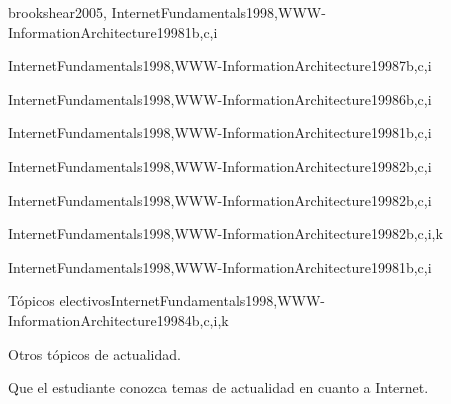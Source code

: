 \begin{syllabus}
\begin{unit}{\SEToolsAndEnvironmentsDef}{brookshear2005, InternetFundamentals1998,WWW-InformationArchitecture1998}{1}{b,c,i}
   \SEToolsAndEnvironmentsAllTopics
   \SEToolsAndEnvironmentsAllObjectives
\end{unit}

\begin{unit}{\NCWebOrganizationDef}{InternetFundamentals1998,WWW-InformationArchitecture1998}{7}{b,c,i}
   \NCWebOrganizationAllTopics
   \NCWebOrganizationAllObjectives
\end{unit}

\begin{unit}{\NCNetworkedApplicationsDef}{InternetFundamentals1998,WWW-InformationArchitecture1998}{6}{b,c,i}
   \NCNetworkedApplicationsAllTopics
   \NCNetworkedApplicationsAllObjectives
\end{unit}

\begin{unit}{\HCGUIDesignDef}{InternetFundamentals1998,WWW-InformationArchitecture1998}{1}{b,c,i}
   \HCGUIDesignAllTopics
   \HCGUIDesignAllObjectives
\end{unit}

\begin{unit}{\NCMultimediaTechnologiesDef}{InternetFundamentals1998,WWW-InformationArchitecture1998}{2}{b,c,i}
   \NCMultimediaTechnologiesAllTopics
   \NCMultimediaTechnologiesAllObjectives
\end{unit}

\begin{unit}{\HCMultimediaAndMultimodalSystemsDef}{InternetFundamentals1998,WWW-InformationArchitecture1998}{2}{b,c,i}
   \HCMultimediaAndMultimodalSystemsAllTopics
   \HCMultimediaAndMultimodalSystemsAllObjectives
\end{unit}

\begin{unit}{\SESoftwareValidationDef}{InternetFundamentals1998,WWW-InformationArchitecture1998}{2}{b,c,i,k}
   \SESoftwareValidationAllTopics
   \SESoftwareValidationAllObjectives
\end{unit}

\begin{unit}{\SPPrivateAndCivilLibertiesDef}{InternetFundamentals1998,WWW-InformationArchitecture1998}{1}{b,c,i}
   \SPPrivateAndCivilLibertiesAllTopics
   \SPPrivateAndCivilLibertiesAllObjectives
\end{unit}

\begin{unit}{Tópicos electivos}{InternetFundamentals1998,WWW-InformationArchitecture1998}{4}{b,c,i,k}
\begin{topics}
      \item Otros tópicos de actualidad.
   \end{topics}
   \begin{learningoutcomes}
      \item Que el estudiante conozca temas de actualidad en cuanto a Internet.
   \end{learningoutcomes}
\end{unit}




\end{syllabus}
